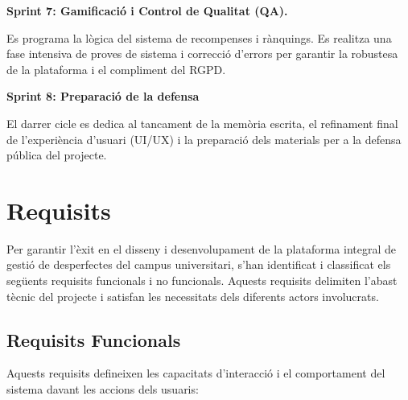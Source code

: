 \documentclass[10pt,a4paper,twocolumn,twoside]{article}
\begin{document}
		\begin{flushleft}
			\textbf{Sprint 7: Gamificació i Control de Qualitat (QA).} \\
		\end{flushleft}
		Es programa la lògica del sistema de recompenses i rànquings. Es realitza una fase intensiva de proves de sistema i correcció d'errors per garantir la robustesa de la plataforma i el compliment del RGPD.
		
		\begin{flushleft}
			\textbf{Sprint 8: Preparació de la defensa} \\
		\end{flushleft}
		El darrer cicle es dedica al tancament de la memòria escrita, el refinament final de l'experiència d'usuari (UI/UX) i la preparació dels materials per a la defensa pública del projecte.
		
		
		\section{Requisits}
		Per garantir l'èxit en el disseny i desenvolupament de la plataforma integral de gestió de desperfectes del campus universitari, s'han identificat i classificat els següents requisits funcionals i no funcionals. Aquests requisits delimiten l'abast tècnic del projecte i satisfan les necessitats dels diferents actors involucrats.
		
		\subsection{Requisits Funcionals}
		Aquests requisits defineixen les capacitats d'interacció i el comportament del sistema davant les accions dels usuaris:
		
\end{document}
